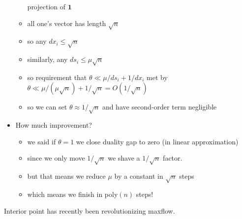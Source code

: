 \documentclass{article}
\begin{document}
\begin{itemize}
\begin{itemize}
 projection of $\mathbf{1}$
\item all one's vector has length $\sqrt{n}$
\item so any $dx_i \le \sqrt{n}$
\item similarly, any $ds_i \le \mu\sqrt{n}$
\item so requirement that $\theta \ll \mu/ds_i+1/dx_i$ met by $\theta \ll \mu/(\mu \sqrt{n}) + 1/\sqrt{n} = O(1/\sqrt{n})$
\item so we can set $\theta \approx 1/\sqrt{n}$ and have second-order term negligible
\end{itemize}
\item How much improvement?
\begin{itemize}
\item we said if $\theta=1$ we close duality gap to zero (in linear approximation)
\item since we only move $1/\sqrt{n}$ we shave a $1/\sqrt{n}$ factor.
\item but that means we reduce $\mu$ by a constant in $\sqrt{n}$ steps
\item which means we finish in poly$(n)$ steps!
\end{itemize}
\end{itemize}

Interior point has recently been revolutionizing maxflow.

\end{document}
